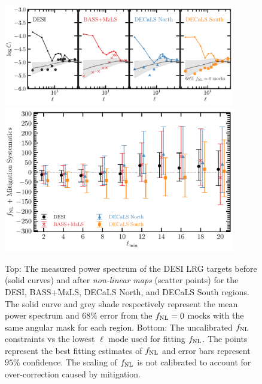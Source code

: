 \begin{figure}
    \centering
    \includegraphics[width=0.9\textwidth]{figures/cldr9_lowell.pdf}
    \includegraphics[width=0.9\textwidth]{figures/fnl_elmin.pdf}  
    \caption{Top: The measured power spectrum of the DESI LRG targets before (solid curves) and after \textit{non-linear  maps} (scatter points) for the DESI, BASS+MzLS, DECaLS North, and DECaLS South regions. The solid curve and grey shade respectively represent the mean power spectrum and $68\%$ error from the $f_{\rm NL}=0$ mocks with the same angular mask for each region. Bottom: The uncalibrated $f_{\rm NL}$ constraints vs the lowest $\ell$ mode used for fitting $f_{\rm NL}$. The points represent the best fitting estimates of $f_{\rm NL}$ and error bars represent $95$\% confidence. The scaling of $f_{\rm NL}$ is not calibrated to account for over-correction caused by mitigation.}\label{fig:mcmc_dr9elmin}
\end{figure}